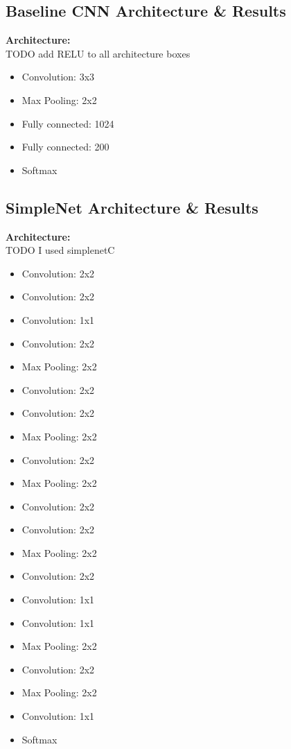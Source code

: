 \documentclass[10pt]{article} %
\begin{document}
	\subsection{Baseline CNN Architecture \& Results}
	\begin{tcolorbox}
		\textbf{Architecture:}
		\\ TODO add RELU to all architecture boxes
		\begin{itemize}
			\setlength\itemsep{-0.3em}
			\item Convolution: 3x3
			\item Max Pooling: 2x2
			\item Fully connected: 1024
			\item Fully connected: 200
			\item Softmax
		\end{itemize}
	\end{tcolorbox}
	
	
	\subsection{SimpleNet Architecture \& Results}
	\begin{tcolorbox}
		\textbf{Architecture:}
		\\ TODO I used simplenetC
		\begin{itemize}
			\setlength\itemsep{-0.3em}
			\item Convolution: 2x2
			\item Convolution: 2x2
			\item Convolution: 1x1
			\item Convolution: 2x2
			\item Max Pooling: 2x2
			\item Convolution: 2x2
			\item Convolution: 2x2
			\item Max Pooling: 2x2
			\item Convolution: 2x2
			\item Max Pooling: 2x2
			\item Convolution: 2x2
			\item Convolution: 2x2
			\item Max Pooling: 2x2
			\item Convolution: 2x2
			\item Convolution: 1x1
			\item Convolution: 1x1
			\item Max Pooling: 2x2
			\item Convolution: 2x2
			\item Max Pooling: 2x2
			\item Convolution: 1x1
			\item Softmax
		\end{itemize}
	\end{tcolorbox}
	
\end{document}
